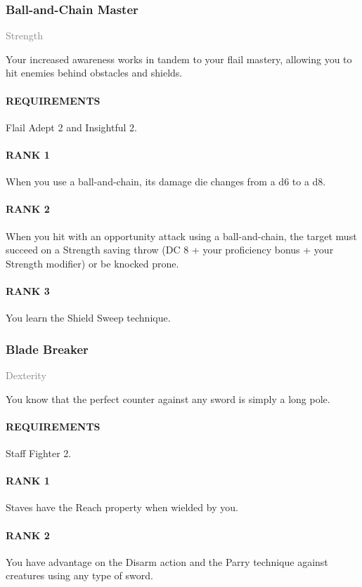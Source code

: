 \subsubsection{Ball-and-Chain Master} \label{feat::ballandchainmaster}
\small{\textcolor{gray}{Strength}}

\normalsize
Your increased awareness works in tandem to your flail mastery, allowing you to hit enemies behind obstacles and shields.
\paragraph{REQUIREMENTS} Flail Adept 2 and Insightful 2.
\paragraph{RANK 1} When you use a ball-and-chain, its damage die changes from a d6 to a d8.
\paragraph{RANK 2} When you hit with an opportunity attack using a ball-and-chain, the target must succeed on a Strength saving throw (DC 8 + your proficiency bonus + your Strength modifier) or be knocked prone.
\paragraph{RANK 3} You learn the Shield Sweep technique.

\subsubsection{Blade Breaker} \label{feat::bladebreaker}
\small{\textcolor{gray}{Dexterity}}

\normalsize
You know that the perfect counter against any sword is simply a long pole.
\paragraph{REQUIREMENTS} Staff Fighter 2.
\paragraph{RANK 1} Staves have the Reach property when wielded by you.
\paragraph{RANK 2} You have advantage on the Disarm action and the Parry technique against creatures using any type of sword.
